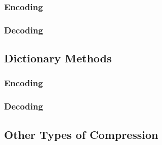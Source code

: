 \documentclass{article}
\begin{document}
\subsubsection{Encoding}

\subsubsection{Decoding}

\subsection{Dictionary Methods}

\subsubsection{Encoding}

\subsubsection{Decoding}

\subsection{Other Types of Compression}

\newpage



\end{document}
